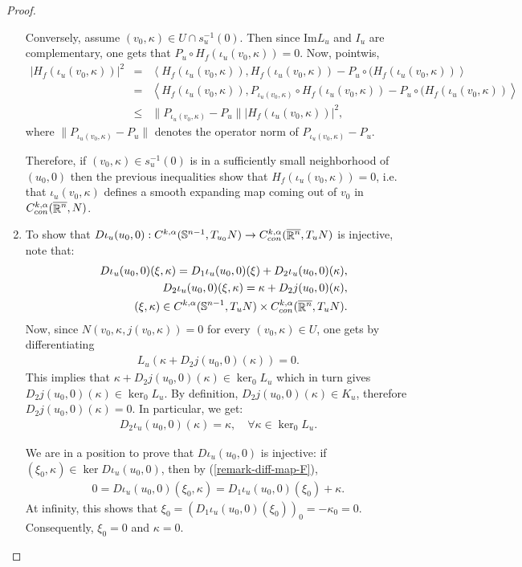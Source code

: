 \documentclass[a4paper,11pt,reqno]{amsart}
\def\R{\mathop{\rm \mathbb{R}}\nolimits}
\newcommand{\Ima}{\text{Im}}
\begin{document}
\begin{proof}
\begin{enumerate}
Conversely, assume $(v_0,\kappa)\in U\cap s_u^{-1}(0)$. Then since $\Ima L_u$ and $I_u$ are complementary, one gets that $P_u\circ H_f(\iota_u(v_0,\kappa))=0$. Now, pointwis, 
\begin{eqnarray*}
|H_f(\iota_u(v_0,\kappa))|^2&=&\left<H_f(\iota_u(v_0,\kappa)),H_f(\iota_u(v_0,\kappa))-P_{u}\circ(H_f(\iota_u(v_0,\kappa))\right>\\
&=&\left<H_f(\iota_u(v_0,\kappa)),P_{\iota_u(v_0,\kappa)}\circ H_f(\iota_u(v_0,\kappa))-P_{u}\circ(H_f(\iota_u(v_0,\kappa))\right>\\
&\leq&\|P_{\iota_u(v_0,\kappa)}-P_u\| |H_f(\iota_u(v_0,\kappa))|^2,
\end{eqnarray*}
where $\|P_{\iota_u(v_0,\kappa)}-P_u\|$ denotes the operator norm of $P_{\iota_u(v_0,\kappa)}-P_u$.

Therefore, if $(v_0,\kappa)\in s_u^{-1}(0)$ is in a sufficiently small neighborhood of $(u_0,0)$ then the previous inequalities show that $H_f(\iota_u(v_0,\kappa))=0$, i.e. that $\iota_u(v_0,\kappa)$ defines a smooth expanding map coming out of $v_0$ in $C_{con}^{k,\alpha}(\overline{\R^n},N)$.\\


\item To show that $D\iota_u(u_0,0):C^{k,\alpha}(\mathbb{S}^{n-1},T_{u_0}N)\rightarrow C_{con}^{k,\alpha}(\overline{\R^n},T_uN)$ is injective, note that:
\begin{eqnarray*}
&&D\iota_u(u_0,0)(\xi,\kappa)=D_1\iota_u(u_0,0)(\xi)+D_2\iota_u(u_0,0)(\kappa),\\
&&D_2\iota_u(u_0,0)(\xi,\kappa)=\kappa+D_2j(u_0,0)(\kappa),\\
&&(\xi,\kappa)\in C^{k,\alpha}(\mathbb{S}^{n-1},T_uN)\times C_{con}^{k,\alpha}(\overline{\R^n},T_uN).
\end{eqnarray*}
Now, since $N(v_0,\kappa,j(v_0,\kappa))=0$ for every $(v_0,\kappa)\in U$, one gets by differentiating 
\begin{eqnarray*}
L_u(\kappa+D_2j(u_0,0)(\kappa))=0.
\end{eqnarray*}
This implies that $\kappa+D_2j(u_0,0)(\kappa)\in \ker_0L_u$ which in turn gives $D_2j(u_0,0)(\kappa)\in \ker_0L_u$. By definition, $D_2j(u_0,0)(\kappa)\in K_u$, therefore $D_2j(u_0,0)(\kappa)=0$. In particular, we get:
\begin{eqnarray}
D_2\iota_u(u_0,0)(\kappa)=\kappa,\quad \forall \kappa\in \ker_0L_u.\label{remark-diff-map-F}
\end{eqnarray}

We are in a position to prove that $D\iota_u(u_0,0)$ is injective: if $(\xi_0,\kappa)\in \ker D\iota_u(u_0,0)$, then by (\ref{remark-diff-map-F}), 
\begin{eqnarray*}
0=D\iota_u(u_0,0)(\xi_0,\kappa)=D_1\iota_u(u_0,0)(\xi_0)+\kappa.
\end{eqnarray*}
At infinity, this shows that $\xi_0=(D_1\iota_u(u_0,0)(\xi_0))_0=-\kappa_0=0.$ Consequently, $\xi_0=0$ and $\kappa=0$. \\



\end{enumerate}
\end{proof}
\end{document}
